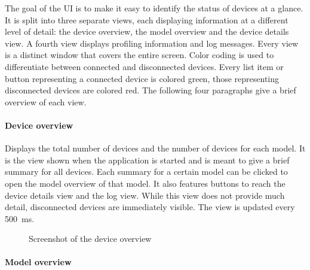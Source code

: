 The goal of the UI is to make it easy to identify the status of devices at a glance. It is split
into three separate views, each displaying information at a different level of detail: the device
overview, the model overview and the device details view. A fourth view displays profiling information
and log messages. Every view is a distinct window that covers the entire screen. Color coding is used
to differentiate between connected and disconnected devices. Every list item or button representing
a connected device is colored green, those representing disconnected devices are colored red. The
following four paragraphs give a brief overview of each view.

\paragraph{Device overview}

Displays the total number of devices and the number of devices for each model. It is the view shown
when the application is started and is meant to give a brief summary for all devices. Each summary
for a certain model can be clicked to open the model overview of that model. It also features buttons
to reach the device details view and the log view. While this view does not provide much detail,
disconnected devices are immediately visible. The view is updated every \SI{500}{\milli\second}.

\begin{figure}[H]
    \centering
    \setlength{\fboxsep}{0mm}
    \caption{Screenshot of the device overview}
\end{figure}

\paragraph{Model overview}

